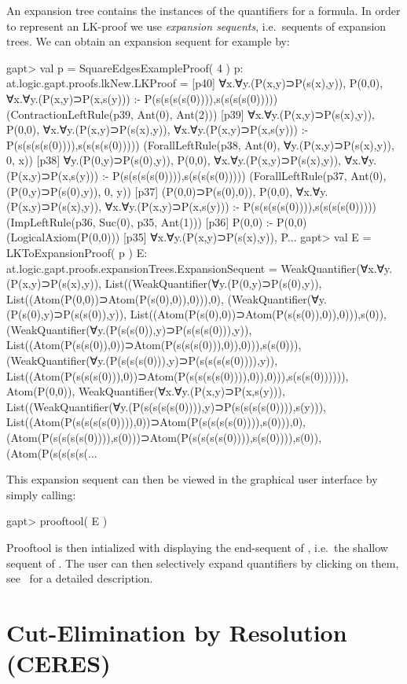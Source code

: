 \documentclass[a4paper,11pt]{article}
\newcommand{\cli}[1]{{\ttfamily {#1}}}
\begin{document}
An expansion tree contains the instances of the quantifiers for a formula. In order
to represent an LK-proof we use {\em expansion sequents}, i.e.~sequents of expansion trees.
We can obtain an expansion sequent for example by:
\begin{clilisting}
gapt> val p = SquareEdgesExampleProof( 4 )
p: at.logic.gapt.proofs.lkNew.LKProof =
[p40] ∀x.∀y.(P(x,y)⊃P(s(x),y)), P(0,0), ∀x.∀y.(P(x,y)⊃P(x,s(y))) :- P(s(s(s(s(0)))),s(s(s(s(0)))))    (ContractionLeftRule(p39, Ant(0), Ant(2)))
[p39] ∀x.∀y.(P(x,y)⊃P(s(x),y)), P(0,0), ∀x.∀y.(P(x,y)⊃P(s(x),y)), ∀x.∀y.(P(x,y)⊃P(x,s(y))) :- P(s(s(s(s(0)))),s(s(s(s(0)))))    (ForallLeftRule(p38, Ant(0), ∀y.(P(x,y)⊃P(s(x),y)), 0, x))
[p38] ∀y.(P(0,y)⊃P(s(0),y)), P(0,0), ∀x.∀y.(P(x,y)⊃P(s(x),y)), ∀x.∀y.(P(x,y)⊃P(x,s(y))) :- P(s(s(s(s(0)))),s(s(s(s(0)))))    (ForallLeftRule(p37, Ant(0), (P(0,y)⊃P(s(0),y)), 0, y))
[p37] (P(0,0)⊃P(s(0),0)), P(0,0), ∀x.∀y.(P(x,y)⊃P(s(x),y)), ∀x.∀y.(P(x,y)⊃P(x,s(y))) :- P(s(s(s(s(0)))),s(s(s(s(0)))))    (ImpLeftRule(p36, Suc(0), p35, Ant(1)))
[p36] P(0,0) :- P(0,0)    (LogicalAxiom(P(0,0)))
[p35] ∀x.∀y.(P(x,y)⊃P(s(x),y)), P...
gapt> val E = LKToExpansionProof( p )
E: at.logic.gapt.proofs.expansionTrees.ExpansionSequent = WeakQuantifier(∀x.∀y.(P(x,y)⊃P(s(x),y)), List((WeakQuantifier(∀y.(P(0,y)⊃P(s(0),y)), List((Atom(P(0,0))⊃Atom(P(s(0),0)),0))),0), (WeakQuantifier(∀y.(P(s(0),y)⊃P(s(s(0)),y)), List((Atom(P(s(0),0))⊃Atom(P(s(s(0)),0)),0))),s(0)), (WeakQuantifier(∀y.(P(s(s(0)),y)⊃P(s(s(s(0))),y)), List((Atom(P(s(s(0)),0))⊃Atom(P(s(s(s(0))),0)),0))),s(s(0))), (WeakQuantifier(∀y.(P(s(s(s(0))),y)⊃P(s(s(s(s(0)))),y)), List((Atom(P(s(s(s(0))),0))⊃Atom(P(s(s(s(s(0)))),0)),0))),s(s(s(0)))))), Atom(P(0,0)), WeakQuantifier(∀x.∀y.(P(x,y)⊃P(x,s(y))), List((WeakQuantifier(∀y.(P(s(s(s(s(0)))),y)⊃P(s(s(s(s(0)))),s(y))), List((Atom(P(s(s(s(s(0)))),0))⊃Atom(P(s(s(s(s(0)))),s(0))),0), (Atom(P(s(s(s(s(0)))),s(0)))⊃Atom(P(s(s(s(s(0)))),s(s(0)))),s(0)), (Atom(P(s(s(s(s(...
\end{clilisting}
This expansion sequent can then be viewed in the graphical user interface by simply calling:
\begin{clilisting}
gapt> prooftool( E )

\end{clilisting}
Prooftool is then intialized with displaying the end-sequent of \cli{p}, i.e.\ the shallow sequent
of \cli{E}. The user can then selectively expand quantifiers by clicking on them, see~\cite{Hetzl13Understanding}
for a detailed description.


\section{Cut-Elimination by Resolution (CERES)}
\end{document}

